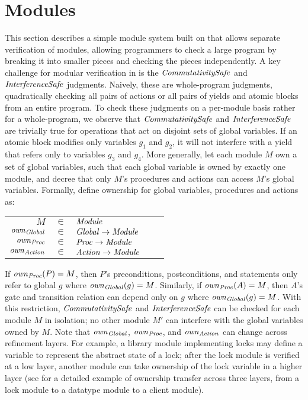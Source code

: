 \section{Modules}
\label{sec:modules}

This section describes a simple module system built on \civl that allows separate verification of modules,
allowing programmers to check a large program by breaking it into smaller pieces and checking the pieces independently.
A key challenge for modular verification in \civl is the $\mathit{CommutativitySafe}$ and $\mathit{InterferenceSafe}$ judgments.
Naively, these are whole-program judgments,
quadratically checking all pairs of actions or all pairs of yields and atomic blocks from an entire program.
To check these judgments on a per-module basis rather for a whole-program,
we observe that $\mathit{CommutativitySafe}$ and $\mathit{InterferenceSafe}$ are trivially true for operations that act on disjoint sets of global variables.
If an atomic block modifies only variables $g_1$ and $g_2$, it will not interfere with a yield that refers only to variables $g_3$ and $g_4$.
More generally, let each module $M$ own a set of global variables, such that each global variable is owned by exactly one module,
and decree that only $M$'s procedures and actions can access $M$'s global variables.
Formally, define ownership for global variables, procedures and actions as:

\hspace{30mm}\begin{tabular}{rclcl}
$M$ & $\in$ & $\mathit{Module}$ \\
$\mathit{own}_{\mathit{Global}}$ & $\in$ & $\mathit{Global} \rightarrow \mathit{Module}$ \\
$\mathit{own}_{\mathit{Proc}}$ & $\in$ & $\mathit{Proc} \rightarrow \mathit{Module}$ \\
$\mathit{own}_{\mathit{Action}}$ & $\in$ & $\mathit{Action} \rightarrow \mathit{Module}$ \\
\end{tabular}

\noindent
If $\mathit{own}_{\mathit{Proc}}(P) = M$, then $P$'s preconditions, postconditions, and statements only refer to global $g$ where $\mathit{own}_{\mathit{Global}}(g) = M$.
Similarly, if $\mathit{own}_{\mathit{Proc}}(A) = M$, then $A$'s gate and transition relation can depend only on $g$ where $\mathit{own}_{\mathit{Global}}(g) = M$.
With this restriction, $\mathit{CommutativitySafe}$ and $\mathit{InterferenceSafe}$ can be checked for each module $M$ in isolation;
no other module $M'$ can interfere with the global variables owned by $M$.
Note that $\mathit{own}_{\mathit{Global}}$, $\mathit{own}_{\mathit{Proc}}$, and $\mathit{own}_{\mathit{Action}}$ can change across refinement layers.
For example, a library module implementing locks may define a variable to represent the abstract state of a lock;
after the lock module is verified at a low layer,
another module can take ownership of the lock variable in a higher layer
(see \cite{gc-techreport} for a detailed example of ownership transfer across three layers, from a lock module to a datatype module to a client module).
